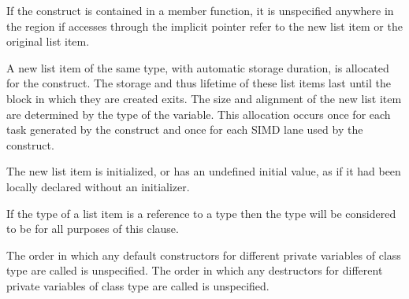 \begin{cppspecific}
If the construct is contained in a member function, it is unspecified
anywhere in the region if accesses through the implicit 
pointer refer to the new list item or the original list item.
\end{cppspecific}

\begin{ccppspecific}
A new list item of the same type, with automatic storage duration, is allocated 
for the construct. The storage and thus lifetime of these list items last until 
the block in which they are created exits. The size and alignment of the new list 
item are determined by the type of the variable. This allocation occurs once for 
each task generated by the construct and once for each SIMD lane used by the construct.

The new list item is initialized, or has an undefined initial value, as if it 
had been locally declared without an initializer.
\end{ccppspecific}

\begin{cppspecific}
If the type of a list item is a reference to a type  then the type will 
be considered to be  for all purposes of this clause.

The order in which any default constructors for different private variables of 
class type are called is unspecified. The order in which any destructors for 
different private variables of class type are called is unspecified.
\end{cppspecific}

